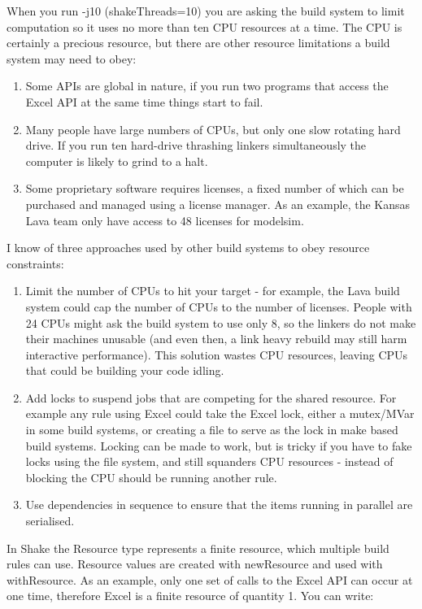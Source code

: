 When you run -j10 (shakeThreads=10) you are asking the build system to limit computation so it uses no more than ten CPU resources at a time. The CPU is certainly a precious resource, but there are other resource limitations a build system may need to obey:

\begin{enumerate}
\item Some APIs are global in nature, if you run two programs that access the Excel API at the same time things start to fail.
\item Many people have large numbers of CPUs, but only one slow rotating hard drive. If you run ten hard-drive thrashing linkers simultaneously the computer is likely to grind to a halt.
\item Some proprietary software requires licenses, a fixed number of which can be purchased and managed using a license manager. As an example, the Kansas Lava team only have access to 48 licenses for modelsim.
\end{enumerate}

I know of three approaches used by other build systems to obey resource constraints:

\begin{enumerate}
\item Limit the number of CPUs to hit your target - for example, the Lava build system could cap the number of CPUs to the number of licenses. People with 24 CPUs might ask the build system to use only 8, so the linkers do not make their machines unusable (and even then, a link heavy rebuild may still harm interactive performance). This solution wastes CPU resources, leaving CPUs that could be building your code idling.
\item Add locks to suspend jobs that are competing for the shared resource. For example any rule using Excel could take the Excel lock, either a mutex/MVar in some build systems, or creating a file to serve as the lock in make based build systems. Locking can be made to work, but is tricky if you have to fake locks using the file system, and still squanders CPU resources - instead of blocking the CPU should be running another rule.
\item Use dependencies in sequence to ensure that the items running in parallel are serialised.
\end{enumerate}

In Shake the Resource type represents a finite resource, which multiple build rules can use. Resource values are created with newResource and used with withResource. As an example, only one set of calls to the Excel API can occur at one time, therefore Excel is a finite resource of quantity 1. You can write:

